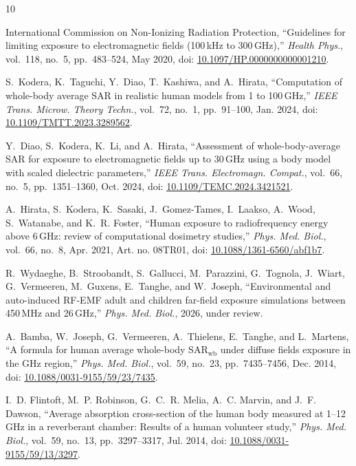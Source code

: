 \documentclass[journal,twocolumn,10pt]{IEEEtran}
\newcommand*{\doi}[1]{\href{https://doi.org/#1}{#1}}
\theoremstyle{plain}
\begin{document}
\begin{thebibliography}{10}
\providecommand{\url}[1]{#1}

International Commission on Non-Ionizing Radiation Protection,
  ``Guidelines for limiting exposure to electromagnetic fields
  (100\,kHz to 300\,GHz),'' \emph{Health Phys.}, vol.~118, no.~5,
  pp.~483--524, May 2020, doi: \doi{10.1097/HP.0000000000001210}.

S.~Kodera, K.~Taguchi, Y.~Diao, T.~Kashiwa, and A.~Hirata,
  ``Computation of whole-body average SAR in realistic human models from
  1 to 100\,GHz,'' \emph{IEEE Trans. Microw. Theory Techn.}, vol.~72,
  no.~1, pp.~91--100, Jan. 2024, doi: \doi{10.1109/TMTT.2023.3289562}.

Y.~Diao, S.~Kodera, K.~Li, and A.~Hirata, ``Assessment of
  whole-body-average SAR for exposure to electromagnetic fields up to
  30\,GHz using a body model with scaled dielectric parameters,''
  \emph{IEEE Trans. Electromagn. Compat.}, vol.~66, no.~5,
  pp.~1351--1360, Oct. 2024, doi: \doi{10.1109/TEMC.2024.3421521}.

A.~Hirata, S.~Kodera, K.~Sasaki, J.~Gomez-Tames, I.~Laakso, A.~Wood,
  S.~Watanabe, and K.~R. Foster, ``Human exposure to radiofrequency
  energy above 6\,GHz: review of computational dosimetry studies,''
  \emph{Phys. Med. Biol.}, vol.~66, no.~8, Apr. 2021, Art. no. 08TR01,
  doi: \doi{10.1088/1361-6560/abf1b7}.

R.~Wydaeghe, B.~Stroobandt, S.~Gallucci, M.~Parazzini, G.~Tognola,
  J.~Wiart, G.~Vermeeren, M.~Guxens, E.~Tanghe, and W.~Joseph,
  ``Environmental and auto-induced RF-EMF adult and children far-field
  exposure simulations between 450\,MHz and 26\,GHz,''
  \emph{Phys. Med. Biol.}, 2026, under review.

A.~Bamba, W.~Joseph, G.~Vermeeren, A.~Thielens, E.~Tanghe, and L.~Martens,
  ``A formula for human average whole-body SAR$_{\mathrm{wb}}$ under diffuse
  fields exposure in the GHz region,'' \emph{Phys. Med. Biol.}, vol.~59,
  no.~23, pp.~7435--7456, Dec. 2014, doi: \doi{10.1088/0031-9155/59/23/7435}.

I.~D. Flintoft, M.~P. Robinson, G.~C.~R. Melia, A.~C. Marvin, and
  J.~F. Dawson, ``Average absorption cross-section of the human body
  measured at 1--12\,GHz in a reverberant chamber: Results of a human
  volunteer study,'' \emph{Phys. Med. Biol.}, vol.~59, no.~13,
  pp.~3297--3317, Jul. 2014, doi: \doi{10.1088/0031-9155/59/13/3297}.


\end{thebibliography}
\end{document}
